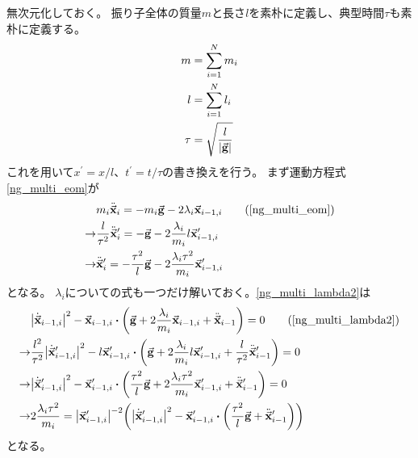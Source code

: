 \documentclass[uplatex]{jsarticle}
\begin{document}
無次元化しておく。
振り子全体の質量$m$と長さ$l$を素朴に定義し、典型時間$\tau$も素朴に定義する。
\begin{align}
    m &= \sum_{i=1}^N m_i \\
    l &= \sum_{i=1}^N l_i \\
    \tau &= \sqrt{\frac{l}{\abs{\va{g}}}}
\end{align}
これを用いて$x^\prime = x/l$、$t^\prime = t / \tau$の書き換えを行う。
まず運動方程式\eqref{ng_multi_eom}が
\begin{align}
    & m_i \ddot{\va{x}}_i = -m_i \va{g} - 2\lambda_i \va{x}_{i-1,i} \tag{\ref{ng_multi_eom}} \\
    \rightarrow &
    \frac{l}{\tau^2} \ddot{\va{x}}_i^\prime = -\va{g} - 2\frac{\lambda_i}{m_i} l \va{x}_{i-1,i}^\prime \nonumber \\
    \rightarrow &
    \ddot{\va{x}}_i^\prime = -\frac{\tau^2}{l} \va{g} - 2 \frac{\lambda_i \tau^2}{m_i} \va{x}_{i-1,i}^\prime
\end{align}
となる。
$\lambda_i$についての式も一つだけ解いておく。\eqref{ng_multi_lambda2}は
\begin{align}
    & \abs{\dot{\va{x}}_{i-1,i}}^2 - \va{x}_{i-1,i} \vdot \qty(\va{g} + 2\frac{\lambda_i}{m_i} \va{x}_{i-1,i} + \ddot{\va{x}}_{i-1}) = 0 \tag{\ref{ng_multi_lambda2}} \\
    \rightarrow &
    \frac{l^2}{\tau^2} \abs{\dot{\va{x}}_{i-1,i}^\prime}^2 - l \va{x}_{i-1,i}^\prime \vdot \qty(\va{g} + 2\frac{\lambda_i}{m_i} l \va{x}_{i-1,i}^\prime + \frac{l}{\tau^2}\ddot{\va{x}}_{i-1}^\prime) = 0 \nonumber \\
    \rightarrow &
    \abs{\dot{\va{x}}_{i-1,i}^\prime}^2 - \va{x}_{i-1,i}^\prime \vdot \qty(\frac{\tau^2}{l}\va{g} + 2\frac{\lambda_i\tau^2}{m_i} \va{x}_{i-1,i}^\prime + \ddot{\va{x}}_{i-1}^\prime) = 0 \nonumber \\
    \rightarrow &
    2\frac{\lambda_i\tau^2}{m_i} = \abs{\va{x}_{i-1,i}^\prime}^{-2} \qty(\abs{\dot{\va{x}}_{i-1,i}^\prime}^2 - \va{x}_{i-1,i}^\prime \vdot \qty(\frac{\tau^2}{l}\va{g} + \ddot{\va{x}}_{i-1}^\prime))
\end{align}
となる。



\end{document}
